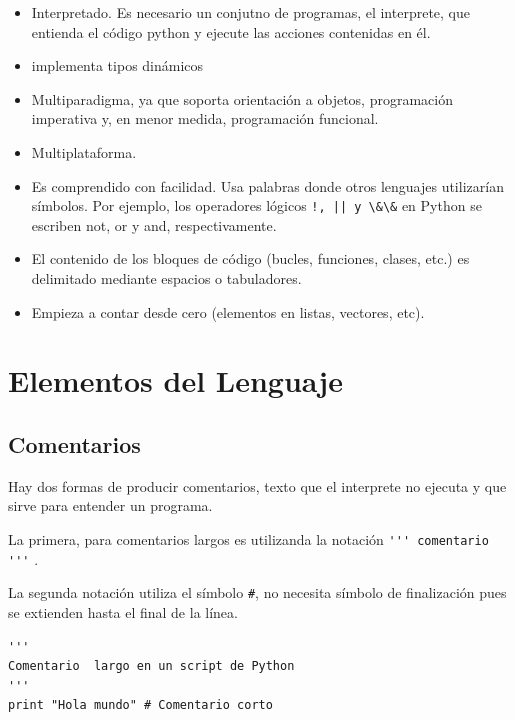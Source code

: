 \begin{itemize}
\item Interpretado. Es necesario un conjutno de programas, el interprete, que entienda el código python y ejecute las acciones contenidas en él.
\item implementa  tipos dinámicos
\item  Multiparadigma, ya que soporta orientación a objetos, programación imperativa y, en menor medida, programación funcional.
\item Multiplataforma.

\item Es comprendido  con facilidad. Usa  palabras donde otros lenguajes utilizarían símbolos. Por ejemplo, los operadores lógicos \verb~!, || y \&\&~ en Python se escriben not, or y and, respectivamente.


\item  El contenido de los bloques de código (bucles, funciones, clases, etc.) es delimitado mediante espacios o tabuladores.

\item Empieza a contar desde cero (elementos en listas, vectores, etc).



\end{itemize}




\section{Elementos del Lenguaje}

\subsection{Comentarios}

Hay dos formas de producir comentarios, texto que el interprete  no ejecuta y que sirve para entender un programa.

La primera, para comentarios largos es utilizanda la notación \linebreak\verb~''' comentario '''~ .


 La segunda notación utiliza el símbolo \verb~#~, no necesita símbolo de finalización pues se extienden hasta el final de la línea.

 \begin{lstlisting}
'''
Comentario  largo en un script de Python
'''
print "Hola mundo" # Comentario corto
\end{lstlisting}

